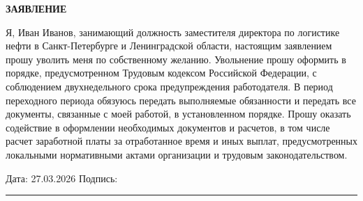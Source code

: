 \documentclass[12pt]{article}
\begin{document}
\begin{center}
\textbf{\LARGE ЗАЯВЛЕНИЕ}
\end{center}

\vspace{1cm}



Я, Иван Иванов, занимающий должность заместителя директора по логистике нефти в Санкт-Петербурге и Ленинградской области, настоящим заявлением прошу уволить меня по собственному желанию. Увольнение прошу оформить в порядке, предусмотренном Трудовым кодексом Российской Федерации, с соблюдением двухнедельного срока предупреждения работодателя. В период переходного периода обязуюсь передать выполняемые обязанности и передать все документы, связанные с моей работой, в установленном порядке. Прошу оказать содействие в оформлении необходимых документов и расчетов, в том числе расчет заработной платы за отработанное время и иных выплат, предусмотренных локальными нормативными актами организации и трудовым законодательством.

\vfill

\noindent
Дата: 27.03.2026 \hfill Подпись: \rule{5cm}{0.4pt}
\end{document}
